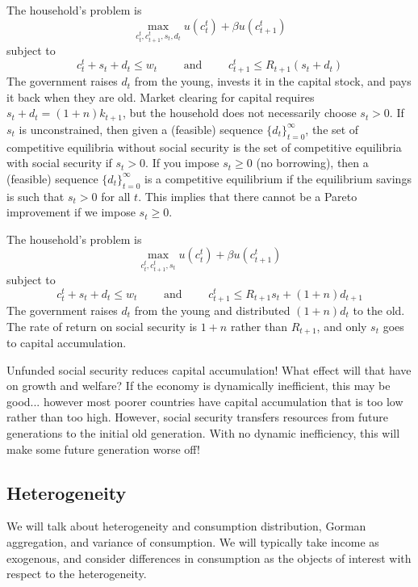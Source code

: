 \documentclass[10pt]{article}
\begin{document}
\begin{example}
	 The household's problem is
	\[
	\max_{c^t_t,c^t_{t+1},s_t,d_t} u(c_t^t) + \beta u(c^t_{t+1})
	\]
	subject to 
	\[
	c^t_t + s_t + d_t \le w_t \qquad \text{ and } \qquad c_{t+1}^t \le R_{t+1}(s_t+d_t)
	\]
	The government raises $d_t$ from the young, invests it in the capital stock, and pays it back when they are old. Market clearing for capital requires $s_t + d_t = (1+n)k_{t+1}$, but the household does not necessarily choose $s_t > 0$. If $s_t$ is unconstrained, then given a (feasible) sequence $\{d_t\}_{t=0}^\infty$, the set of competitive equilibria without social security is the set of competitive equilibria with social security if $s_t > 0$. If you impose $s_t \ge 0$ (no borrowing), then a (feasible) sequence $\{d_t\}_{t=0}^\infty$ is a competitive equilibrium if the equilibrium savings is such that $s_t > 0$ for all $t$. This implies that there cannot be a Pareto improvement if we impose $s_t \ge 0$.
\end{example}

\begin{example}
	 The household's problem is 
	\[
	\max_{c^t_t,c^t_{t+1},s_t} u(c_t^t) + \beta u(c^t_{t+1})
	\]
	subject to 
	\[
	c^t_t + s_t + d_t \le w_t \qquad \text{ and } \qquad c_{t+1}^t \le R_{t+1}s_t + (1+n)d_{t+1}
	\]
	The government raises $d_t$ from the young and distributed $(1+n)d_t$ to the old. The rate of return on social security is $1+n$ rather than $R_{t+1}$, and only $s_t$ goes to capital accumulation. 
\end{example}

\begin{remark}
	Unfunded social security reduces capital accumulation! What effect will that have on growth and welfare? If the economy is dynamically inefficient, this may be good... however most poorer countries have capital accumulation that is too low rather than too high. However, social security transfers resources from future generations to the initial old generation. With no dynamic inefficiency, this will make some future generation worse off!
\end{remark}



\subsection{Heterogeneity}

We will talk about heterogeneity and consumption distribution, Gorman aggregation, and variance of consumption. We will typically take income as exogenous, and consider differences in consumption as the objects of interest with respect to the heterogeneity.
\end{document}
